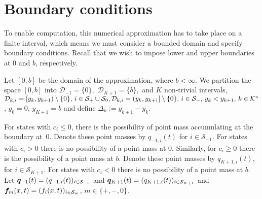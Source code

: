 \section{Boundary conditions}\label{subsec: boundary DG}
To enable computation, this numerical approximation has to take place on a finite interval, which means we must consider a bounded domain and specify boundary conditions. Recall that we wish to impose lower and upper boundaries at \(0\) and \(b\), respectively. %

Let $[0,b]$ be the domain of the approximation, where $b < \infty$. We partition the space $[0,b]$ into \(\mathcal D_{-1}=\{0\},\) \(\mathcal D_{K+1}=\{b\},\) and \(K\) non-trivial intervals, \(\mathcal{D}_{k,i}=[y_k,y_{k+1})\setminus \{0\},\,i\in\mathcal{S}_+\cup\mathcal{S}_0,\mathcal{D}_{k,i}=(y_k,y_{k+1}]\setminus \{0\},\,i\in\mathcal{S}_-,\, y_k<y_{k+1},\, k\in\mathcal K^\circ\), \(y_0=0,\,y_{K+1}=b\) and define \(\Delta_k := y_{k+1}-y_k\). 

For states with \(c_i\leq 0\), there is the possibility of point mass accumulating at the boundary at~\(0\). Denote these point masses by \(q_{{-1},i}(t)\) for \(i\in\mathcal S_{-1}\). For states with \(c_i>0\) there is no possibility of a point mass at \(0\). Similarly, for \(c_i\geq 0\) there is the possibility of a point mass at \(b\). Denote these point masses by \(q_{{K+1},i}(t)\), for \(i\in\mathcal S_{K+1}\). For states with \(c_i<0\) there is no possibility of a point mass at \(b\). Let \(\boldsymbol q_{-1}(t)=(q_{{-1},i}(t))_{i\in\mathcal{S}_{-1}}\) and \(\boldsymbol q_{K+1}(t) = (q_{{K+1},i}(t))_{i\in\mathcal{S}_{K+1}}\) and \(\boldsymbol f_m(x,t) = (f_i(x,t))_{i\in\mathcal{S}_m}\), \(m\in\{+,-,0\}\). 

